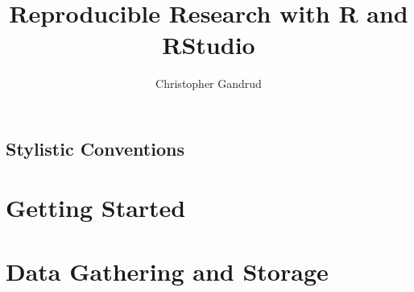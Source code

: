 \documentclass[krantz1]{krantz}\usepackage{graphicx, color}
\newcommand{\blankpage}{
\newpage
\thispagestyle{empty}
\mbox{}
\newpage
}
\begin{document}
\title{Reproducible Research with R and RStudio}

\author{Christopher Gandrud}

\maketitle


\frontmatter

\blankpage
\blankpage
\blankpage
\blankpage





\tableofcontents

\chapter*{Stylistic Conventions}\label{StylisticConventions}










\listoffigures
\listoftables


\mainmatter

\setcounter{page}{1}

\part{Getting Started}











\part{Data Gathering and Storage}







\end{document}
